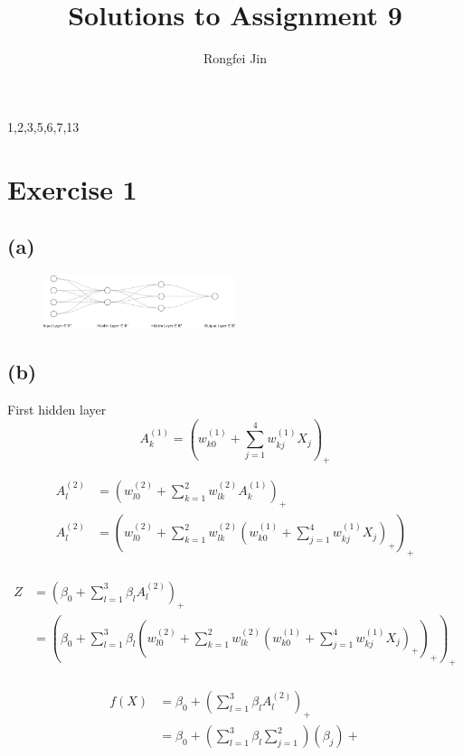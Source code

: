 \documentclass{article}
\title{Solutions to Assignment 9}
\author{Rongfei Jin}
\begin{document}
\pagestyle{fancy}
\fancyhf{}%
\fancyfoot[C]{\thepage}%
\maketitle

1,2,3,5,6,7,13

\section*{Exercise 1}
\subsection*{(a)}
\begin{figure}[h]
    \centering
    \includegraphics[width=0.5\textwidth]{figs/q1a.png}
    \caption{}
    \label{fig:}
\end{figure}

\subsection*{(b)}
First hidden layer
\[
A_k^{(1)} = (w_{k0}^{(1)} + \sum_{j=1}^{4} w_{kj}^{(1)}X_j)_+
\]

\begin{align*}
A_l^{(2)} &= (w_{l0}^{(2)} + \sum_{k=1}^{2} w_{lk}^{(2)} A_k^{(1)})_+ \\
A_l^{(2)} &= 
(w_{l0}^{(2)} + \sum_{k=1}^{2} w_{lk}^{(2)} 
(w_{k0}^{(1)} + \sum_{j=1}^{4} w_{kj}^{(1)}X_j)_+
)_+ \\
\end{align*}

\begin{align*}
Z &= (\beta_0 + \sum_{l=1}^{3} \beta_l A_l^{(2)})_+ \\
&= (\beta_0 + \sum_{l=1}^{3} \beta_l
(w_{l0}^{(2)} + \sum_{k=1}^{2} w_{lk}^{(2)} 
(w_{k0}^{(1)} + \sum_{j=1}^{4} w_{kj}^{(1)}X_j)_+
)_+)_+ \\
\end{align*}


\begin{align*}
f(X) 
&= \beta_0 + (\sum_{l=1}^{3}\beta_l A_l^{(2)})_+ \\
&= \beta_0 + (\sum_{l=1}^{3}\beta_l \sum_{j=1}^{2})(\beta_j)+ \\
\end{align*}
\end{document}
